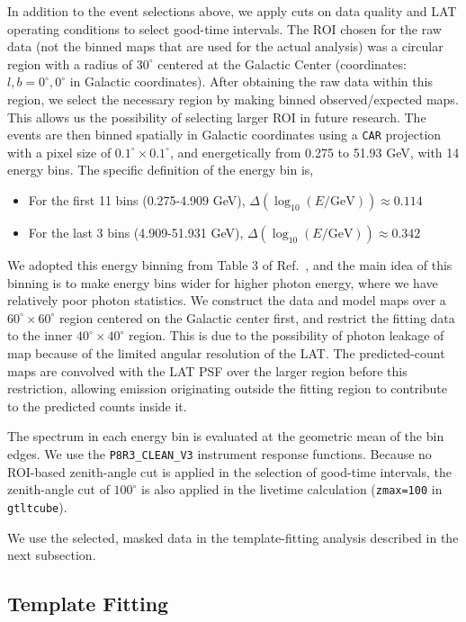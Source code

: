 \documentclass[superscriptaddress,
showpacs,preprintnumbers,nofootinbib,eqsecnum,amsmath,amssymb,aps,11pt, groupedaddress, floatfix]{revtex4-2}
\begin{document}
In addition to the event selections above, we apply cuts on data quality and LAT operating conditions to select good-time intervals.
The ROI chosen for the raw data (not the binned maps that are used for the actual analysis) was a circular region with a radius of $30^\circ$ centered at the Galactic Center (coordinates: $l, b = 0^\circ, 0^\circ$ in Galactic coordinates). After obtaining the raw data within this region, we select the necessary region by making binned observed/expected maps. This allows us the possibility of selecting larger ROI in future research.
The events are then binned spatially in Galactic coordinates using a \texttt{CAR} projection with a pixel size of $0.1^\circ\times0.1^\circ$, and energetically from 0.275 to 51.93 GeV, with 14 energy bins. The specific definition of the energy bin is,
\begin{itemize}
    \item For the first 11 bins (0.275-4.909 GeV), $\Delta(\log_{10}(E/\text{GeV})) \approx0.114$
    \item For the last 3 bins (4.909-51.931 GeV), $\Delta(\log_{10}(E/\text{GeV})) \approx0.342$
\end{itemize}
We adopted this energy binning from Table 3 of Ref.~\cite{Cholis:2021rpp}, and the main idea of this binning is to make energy bins wider for higher photon energy, where we have relatively poor photon statistics.
We construct the data and model maps over a $60^\circ\times60^\circ$ region centered on the Galactic center first, and restrict the fitting data to the inner $40^\circ\times40^\circ$ region. This is due to the possibility of photon leakage of map because of the limited angular resolution of the LAT.
The predicted-count maps are convolved with the LAT PSF over the larger region before this restriction, allowing emission originating outside the fitting region to contribute to the predicted counts inside it.

The spectrum in each energy bin is evaluated at the geometric mean of the bin edges. We use the \texttt{P8R3\_CLEAN\_V3} instrument response functions. Because no ROI-based zenith-angle cut is applied in the selection of good-time intervals, the zenith-angle cut of $100^\circ$ is also applied in the livetime calculation (\texttt{zmax=100} in \texttt{gtltcube}).

We use the selected, masked data in the template-fitting analysis described in the next subsection.

\subsection{Template Fitting}
\label{sec:Template fitting}
\end{document}
